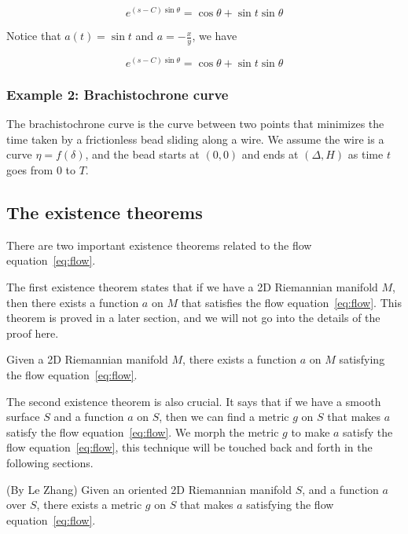 $$ e^{(s - C) \sin \theta}= \cos \theta + \sin t \sin \theta$$

Notice that  $a(t) = \sin t$ and $a = - \frac{x}{y}$, we have


$$ e^{(s - C) \sin \theta}= \cos \theta + \sin t \sin \theta$$


\subsubsection{Example 2: Brachistochrone curve}\label{subsubsec:brachistochrone}

The brachistochrone curve is the curve between two points that minimizes the time taken by a frictionless bead sliding along a wire.
We assume the wire is a curve $\eta = f(\delta)$, and the bead starts at $(0, 0)$ and ends at $( \Delta, H )$ as time $t$ goes from $0$ to $T$.

\subsection{The existence theorems}\label{subsec:existence-theorems}

There are two important existence theorems related to the flow equation~\eqref{eq:flow}.

The first existence theorem states that if we have a 2D Riemannian manifold $M$, then there exists a function $a$ on $M$ that satisfies the flow equation~\eqref{eq:flow}. This theorem is proved in a later section, and we will not go into the details of the proof here.

\begin{theorem}
    Given a 2D Riemannian manifold $M$, there exists a function $a$ on $M$ satisfying the flow equation~\eqref{eq:flow}.
    \label{prop:existence1st}
\end{theorem}

The second existence theorem is also crucial.
It says that if we have a smooth surface $S$ and a function $a$ on $S$, then we can find a metric $g$ on $S$ that makes $a$ satisfy the flow equation~\eqref{eq:flow}.
We morph the metric $g$ to make $a$ satisfy the flow equation~\eqref{eq:flow}, this technique will be touched back and forth in the following sections.

\begin{theorem}(By Le Zhang)
    Given an oriented 2D Riemannian manifold $S$, and a function $a$ over $S$, there exists a metric $g$ on $S$ that makes $a$
    satisfying the flow equation~\eqref{eq:flow}.
    \label{prop:existence2nd}
\end{theorem}

